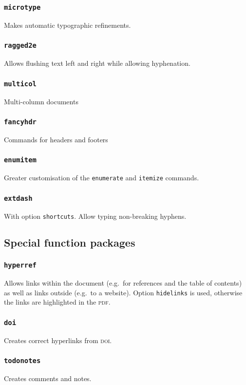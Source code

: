 \documentclass{article}
\begin{document}
\subsubsection{\texttt{microtype}}
Makes automatic typographic refinements.
\subsubsection{\texttt{ragged2e}}
Allows flushing text left and right while allowing hyphenation.
\subsubsection{\texttt{multicol}}
Multi-column documents
\subsubsection{\texttt{fancyhdr}}
Commands for headers and footers
\subsubsection{\texttt{enumitem}}
Greater customisation of the \texttt{enumerate} and \texttt{itemize} commands.
\subsubsection{\texttt{extdash}}
With option \texttt{shortcuts}. Allow typing non-breaking hyphens.

\subsection{Special function packages}
\subsubsection{\texttt{hyperref}}
Allows links within the document (e.g.\ for references and the table of contents) as well as links outside (e.g.\ to a website). Option \texttt{hidelinks} is used, otherwise the links are highlighted in the \textsc{pdf}.
\subsubsection{\texttt{doi}}
Creates correct hyperlinks from \textsc{doi}.
\subsubsection{\texttt{todonotes}}
Creates comments and notes.
\end{document}

